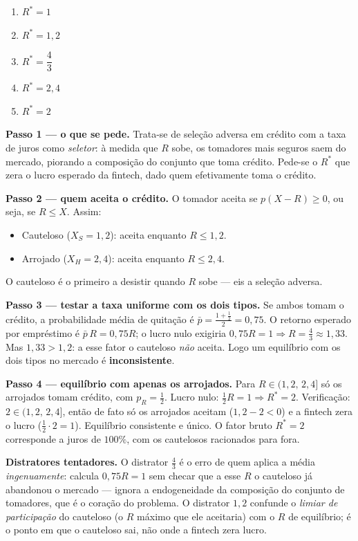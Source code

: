 \begin{enumerate}[label=\Alph*., leftmargin=3.2em, itemsep=0.05em, topsep=0.1em]
  \item $R^{*}=1$
  \item $R^{*}=1{,}2$
  \item $R^{*}=\dfrac{4}{3}$
  \item $R^{*}=2{,}4$
  \item $R^{*}=2$
\end{enumerate}
\begin{solucao}
\textbf{Passo 1 --- o que se pede.} Trata-se de sele\c{c}\~ao adversa em cr\'edito com a taxa de juros como \emph{seletor}: \`a medida que $R$ sobe, os tomadores mais seguros saem do mercado, piorando a composi\c{c}\~ao do conjunto que toma cr\'edito. Pede-se o $R^{*}$ que zera o lucro esperado da fintech, dado quem efetivamente toma o cr\'edito.

\textbf{Passo 2 --- quem aceita o cr\'edito.} O tomador aceita se $p(X-R)\ge 0$, ou seja, se $R\le X$. Assim:
\begin{itemize}
\item Cauteloso ($X_S=1{,}2$): aceita enquanto $R\le 1{,}2$.
\item Arrojado ($X_H=2{,}4$): aceita enquanto $R\le 2{,}4$.
\end{itemize}
O cauteloso \'e o primeiro a desistir quando $R$ sobe --- eis a sele\c{c}\~ao adversa.

\textbf{Passo 3 --- testar a taxa uniforme com os dois tipos.} Se ambos tomam o cr\'edito, a probabilidade m\'edia de quita\c{c}\~ao \'e $\bar p=\tfrac{1+\tfrac12}{2}=0{,}75$. O retorno esperado por empr\'estimo \'e $\bar p\,R=0{,}75R$; o lucro nulo exigiria $0{,}75R=1\Rightarrow R=\tfrac{4}{3}\approx 1{,}33$. Mas $1{,}33>1{,}2$: a esse fator o cauteloso \emph{n\~ao} aceita. Logo um equil\'ibrio com os dois tipos no mercado \'e \textbf{inconsistente}.

\textbf{Passo 4 --- equil\'ibrio com apenas os arrojados.} Para $R\in(1{,}2,\,2{,}4]$ s\'o os arrojados tomam cr\'edito, com $p_R=\tfrac12$. Lucro nulo: $\tfrac12 R=1\Rightarrow R^{*}=2$. Verifica\c{c}\~ao: $2\in(1{,}2,\,2{,}4]$, ent\~ao de fato s\'o os arrojados aceitam ($1{,}2-2<0$) e a fintech zera o lucro ($\tfrac12\cdot 2=1$). Equil\'ibrio consistente e \'unico. O fator bruto $R^{*}=2$ corresponde a juros de $100\%$, com os cautelosos racionados para fora.

\textbf{Distratores tentadores.} O distrator $\tfrac{4}{3}$ \'e o erro de quem aplica a m\'edia \emph{ingenuamente}: calcula $0{,}75R=1$ sem checar que a esse $R$ o cauteloso j\'a abandonou o mercado --- ignora a endogeneidade da composi\c{c}\~ao do conjunto de tomadores, que \'e o cora\c{c}\~ao do problema. O distrator $1{,}2$ confunde o \emph{limiar de participa\c{c}\~ao} do cauteloso (o $R$ m\'aximo que ele aceitaria) com o $R$ de equil\'ibrio; \'e o ponto em que o cauteloso sai, n\~ao onde a fintech zera lucro.


\end{solucao}
